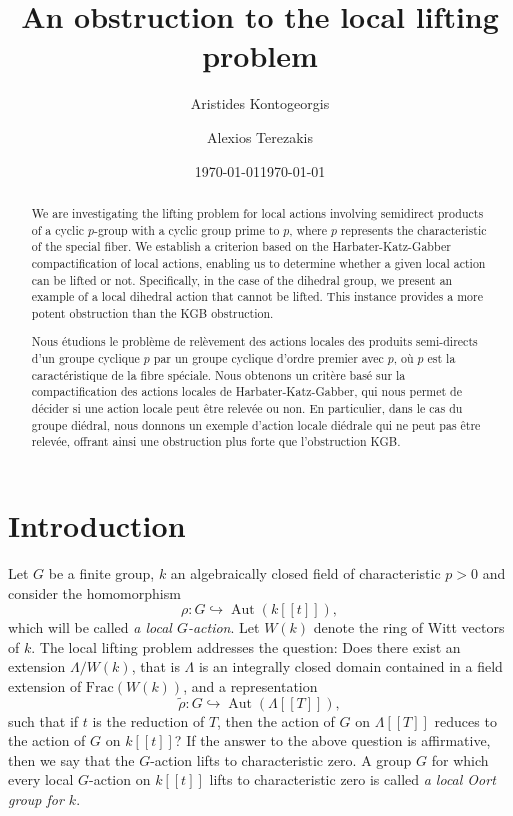 \documentclass[11pt,letterpaper]{amsart}
\date{\today}
\title{An obstruction to the local lifting problem}
\author[A. Kontogeorgis]{Aristides Kontogeorgis}
\author[A. Terezakis]{Alexios Terezakis }
\date \today
\theoremstyle{definition}
\DeclareMathOperator\Aut{Aut}
\begin{document}


\begin{abstract}
We are investigating the 
lifting problem for local actions
involving semidirect products of a cyclic $p$-group with a cyclic group prime to $p$, where $p$ represents the characteristic of the special fiber. We establish a criterion based on the Harbater-Katz-Gabber compactification of local actions, enabling us to determine whether a given local action can be lifted or not. Specifically, in the case of the dihedral group, we present an example of a local dihedral action that cannot be lifted. This instance provides a more potent obstruction than the KGB obstruction.


\bigskip

 Nous étudions le problème de relèvement des actions locales des produits semi-directs d'un groupe cyclique $p$ par un groupe cyclique d'ordre premier avec $p$, où $p$ est la caractéristique de la fibre spéciale. Nous  obtenons un critère basé sur la compactification des actions locales de Harbater-Katz-Gabber, qui nous permet de décider si une action locale peut être relevée ou non. En particulier, dans le cas du groupe diédral, nous donnons un exemple d'action locale diédrale qui ne peut pas être relevée, offrant ainsi une obstruction plus forte que l'obstruction KGB.
 \end{abstract}
\maketitle


\section{Introduction}

Let $G$ be a finite group, $k$ an algebraically closed field of characteristic $p>0$ and consider the homomorphism  
\[
\rho: G \hookrightarrow \Aut(k[[t]]), 
\]
which will be called {\em a local $G$-action}. Let $W(k)$ denote the ring of Witt vectors of $k$. 
The local lifting problem addresses the question:
Does there exist an extension $\Lambda/W(k)$, that is $\Lambda$ is an integrally closed domain contained in a field extension of $\mathrm{Frac}(W(k))$, and a representation 
\[
\tilde{\rho}: G \hookrightarrow \Aut(\Lambda[[T]]),
\]
such that if $t$ is the reduction of $T$, then the action of $G$ on $\Lambda[[T]]$
reduces to the action of $G$ on $k[[t]]$?
If the answer to the above question is affirmative, then we say that the $G$-action lifts to characteristic zero. 
A group $G$ for which every local $G$-action on $k[[t]]$ lifts to characteristic zero is called {\em a local Oort group for $k$}. 
\end{document}
